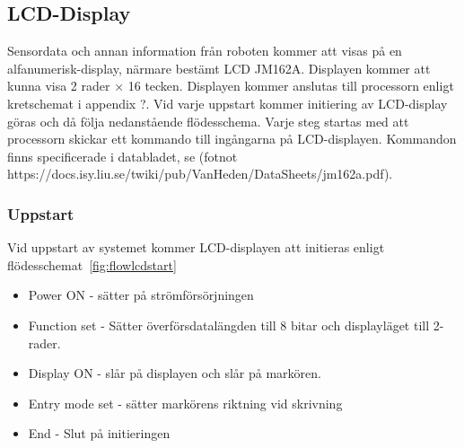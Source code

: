 \documentclass[a4paper,12pt,fleqn]{article}
\begin{document}
\subsection{LCD-Display}
Sensordata och annan information från roboten kommer att visas på en alfanumerisk-display, närmare bestämt  LCD JM162A. Displayen kommer att kunna visa 2 rader × 16 tecken.
Displayen kommer anslutas till processorn enligt kretschemat i appendix ?. 
Vid varje uppstart kommer initiering av LCD-display göras och då följa nedanstående flödesschema. Varje steg startas med att processorn skickar ett kommando till ingångarna på LCD-displayen. Kommandon finns specificerade i databladet, se (fotnot https://docs.isy.liu.se/twiki/pub/VanHeden/DataSheets/jm162a.pdf). 

\subsubsection{Uppstart}
	
Vid uppstart av systemet kommer LCD-displayen att initieras enligt flödesschemat~\ref{fig:flowlcdstart}

\begin{itemize}
  \item Power ON - sätter på strömförsörjningen
  \item Function set - Sätter överförsdatalängden till 8 bitar och displayläget till 2-rader.
  \item Display ON - slår på displayen och slår på markören. 
  \item Entry mode set - sätter markörens riktning vid skrivning
  \item End - Slut på initieringen
\end{itemize}
\end{document}
